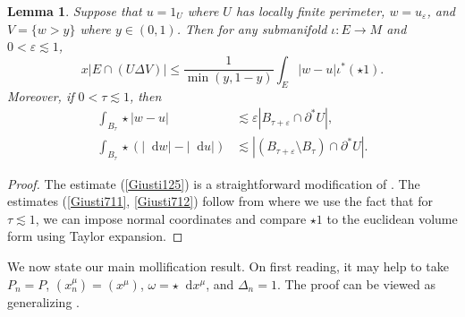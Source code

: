 \documentclass[reqno,10pt]{amsart}
\newcommand*\dif{\mathop{}\!\mathrm{d}}
\newtheorem{lemma}[theorem]{Lemma}
\theoremstyle{definition}
\numberwithin{equation}{section}
\begin{document}
\begin{lemma}
Suppose that $u = 1_U$ where $U$ has locally finite perimeter, $w = u_\varepsilon$, and $V = \{w > y\}$ where $y \in (0, 1)$.
Then for any submanifold $\iota: E \to M$ and $0 < \varepsilon \lesssim 1$,
\begin{equation}\label{Giusti125}
x|E \cap (U \Delta V)| \leq \frac{1}{\min(y, 1 - y)} \int_E |w - u| \iota^*(\star 1).
\end{equation}
Moreover, if $0 < \tau \lesssim 1$, then
\begin{align}
\int_{B_\tau} \star |w - u| &\lesssim \varepsilon |B_{\tau + \varepsilon} \cap \partial^* U|, \label{Giusti711}\\
\int_{B_\tau} \star (|\dif w| - |\dif u|) &\lesssim |(B_{\tau + \varepsilon} \setminus B_\tau) \cap \partial^* U|. \label{Giusti712}
\end{align}
\end{lemma}
\begin{proof}
The estimate (\ref{Giusti125}) is a straightforward modification of \cite[Lemma 1.25]{Giusti77}.
The estimates (\ref{Giusti711}, \ref{Giusti712}) follow from \cite[Lemma 7.2]{Giusti77} where we use the fact that for $\tau \lesssim 1$, we can impose normal coordinates and compare $\star 1$ to the euclidean volume form using Taylor expansion.
\end{proof}

We now state our main mollification result.
On first reading, it may help to take $P_n = P$, $(x^\mu_n) = (x^\mu)$, $\omega = \star \dif x^\mu$, and $\Delta_n = 1$.
The proof can be viewed as generalizing \cite[Lemma 7.5]{Giusti77}.
\end{document}
